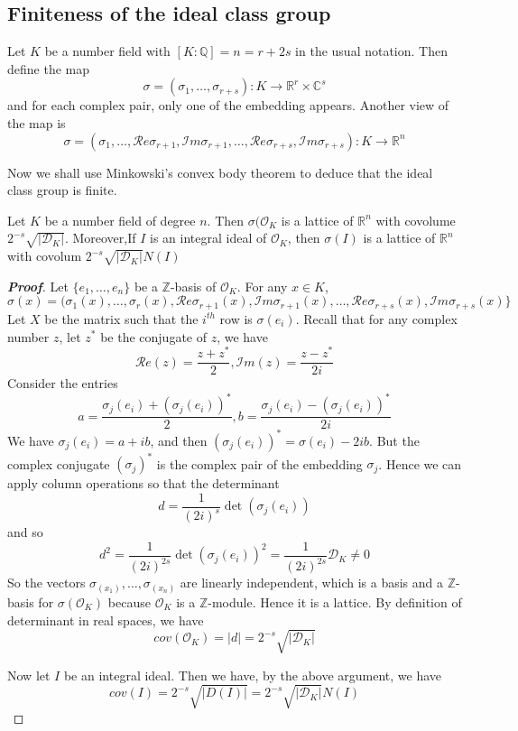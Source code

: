 \subsection{Finiteness of the ideal class group}
\begin{definition} Let $K$ be a number field with $[K:\mathbb{Q}]=n=r+2s$ in the usual notation. Then
define the map
$$\sigma=(\sigma_1,\ldots,\sigma_{r+s}): K \rightarrow \mathbb{R}^r \times \mathbb{C}^s$$
and for each complex pair, only one of the embedding appears. Another view of the map is
$$\sigma=(\sigma_1,\ldots,\mathcal{R}e\sigma_{r+1},\mathcal{I}m\sigma_{r+1},\ldots,\mathcal{R}e\sigma_{r+s},
\mathcal{I}m\sigma_{r+s}): K \rightarrow \mathbb{R}^n$$
\end{definition}
Now we shall use Minkowski's convex body theorem to deduce that the ideal class group is finite.
\begin{proposition} Let $K$ be a number field of degree $n$. Then $\sigma(\mathcal{O}_K$ is a lattice of $\mathbb{R}^n$ with covolume $2^{-s}\sqrt{|\mathcal{D}_K|}$.
Moreover,If $I$ is an integral ideal of $\mathcal{O}_K$, then
$\sigma(I)$ is a lattice of $\mathbb{R}^n$ with covolum $2^{-s} \sqrt{|\mathcal{D}_K|}N(I)$
\end{proposition}
\begin{proof}[\bf Proof] Let $\{e_1,\ldots,e_n\}$ be a $\mathbb{Z}$-basis of $\mathcal{O}_K$. For any $x \in K$,
$$\sigma(x)=(\sigma_1(x),\ldots,\sigma_r(x),\mathcal{R}e\sigma_{r+1}(x),\mathcal{I}m\sigma_{r+1}(x),\ldots,
\mathcal{R}e\sigma_{r+s}(x),\mathcal{I}m\sigma_{r+s}(x)\}$$
Let $X$ be the matrix such that the $i^{th}$ row is $\sigma(e_i)$.
Recall that for any complex number $z$, let $z^*$ be the conjugate of $z$, we have
$$\mathcal{R}e(z)=\frac{z+z^*}{2},\mathcal{I}m(z)=\frac{z-z^*}{2i}$$
Consider the entries
$$a=\frac{\sigma_j(e_i)+(\sigma_j(e_i))^*}{2}, b=\frac{\sigma_j(e_i)-(\sigma_j(e_i))^*}{2i}$$
We have $\sigma_j(e_i)=a+ib$, and then $(\sigma_j(e_i))^*=\sigma(e_i)-2ib$.
But the complex conjugate $(\sigma_j)^*$ is the complex pair of the embedding $\sigma_j$.
Hence we can apply column operations so that the determinant
$$d=\frac{1}{(2i)^s}\det{(\sigma_{j}(e_i))}$$
and so
$$d^2=\frac{1}{(2i)^{2s}}\det{(\sigma_j(e_i))}^2=\frac{1}{(2i)^{2s}}\mathcal{D}_K \neq 0$$
So the vectors $\sigma_(x_1),\ldots,\sigma_(x_n)$ are linearly independent, which is a basis and a
$\mathbb{Z}$-basis for $\sigma(\mathcal{O}_K)$ because $\mathcal{O}_K$ is a $\mathbb{Z}$-module.
Hence it is a lattice. By definition of determinant in real spaces, we have
$$cov(\mathcal{O}_K)=|d|=2^{-s} \sqrt{|\mathcal{D}_K|}$$

Now let $I$ be an integral ideal. Then we have, by the above argument, we have
$$cov(I)=2^{-s}\sqrt{|D(I)|}=2^{-s} \sqrt{|\mathcal{D}_K|}N(I)$$
\end{proof}
